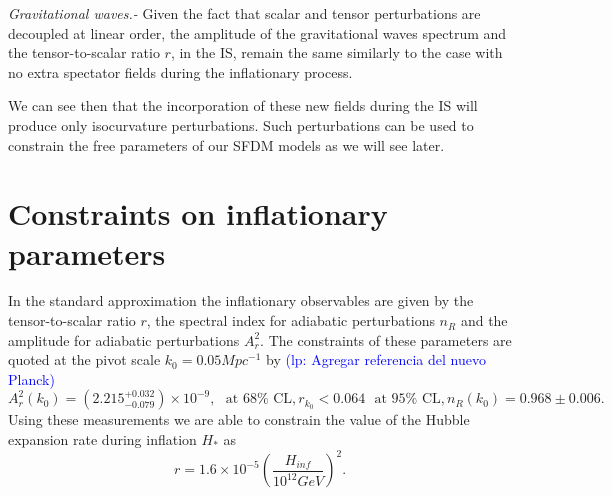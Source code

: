 \documentclass[amssymb,twocolumn,prd,nofootinbib,showpacs]{revtex4-1}
\newcommand{\lp}[1]{\textcolor{blue}{(lp: #1)}}
\begin{document}
\textit{Gravitational waves.-}
Given  the  fact  that  scalar  and tensor  perturbations  are  decoupled  at  linear  order,  
the amplitude  of the  gravitational  waves  spectrum and  the tensor-to-scalar ratio $r$, 
in the IS, remain the same similarly to the case with no extra spectator fields during the inflationary process.

We  can  see  then  that  the  incorporation  of  these  new fields during the IS will produce 
only isocurvature perturbations.  Such perturbations can be used to constrain the free 
parameters of our SFDM models as we will see later.
\section{Constraints on inflationary parameters}\label{experimentos}

In the standard approximation the inflationary observables are given by the tensor-to-scalar ratio $r$, 
the spectral index for adiabatic perturbations $n_R$ and the amplitude for adiabatic perturbations $A_r^2$.  
The constraints of these parameters are quoted at the pivot scale $k_0=0.05 Mpc^{-1}$ 
by \cite{const1,const2,planck,const3,const4,const5}\lp{Agregar referencia del nuevo Planck}
%
\begin{subequations}
\begin{equation}\label{amplitude}
A_r^2(k_0)=(2.215^{+0.032}_{-0.079})\times 10^{-9}, \ \ \ \text{at $68\%$ CL},
\end{equation}
\begin{equation}
r_{k_0}<0.064 \ \ \ \text{at $95\%$ CL},
\end{equation}
\begin{equation}\label{n_R}
n_R(k_0)=0.968 \pm 0.006.
\end{equation}
\end{subequations}
%
Using these measurements we are able to constrain the value of the Hubble expansion rate during 
inflation $H_*$ as \cite{H1,H2}
%
\begin{equation}\label{Hinf}
r = 1.6\times 10^{-5}\left(\frac{H_{inf}}{10^{12}GeV}\right)^2.
\end{equation}
\end{document}
